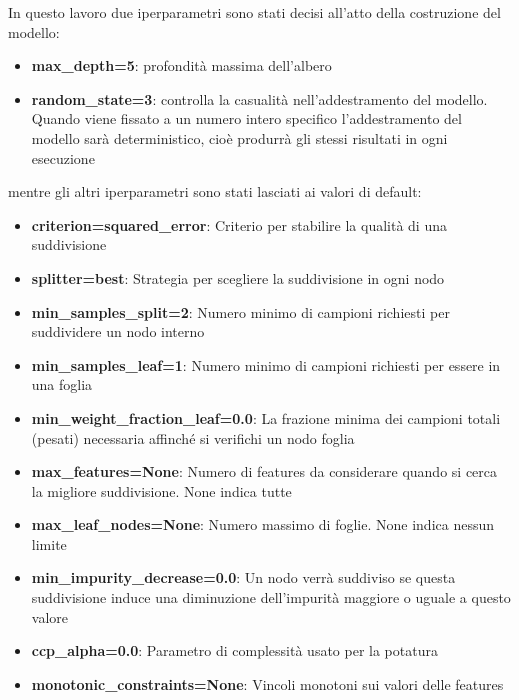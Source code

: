 \noindent In questo lavoro due iperparametri sono stati decisi all'atto della costruzione del modello:
\begin{itemize}
    \item \textbf{max\_depth=5}: profondità massima dell'albero
    \item \textbf{random\_state=3}:  controlla la casualità nell'addestramento del modello. Quando viene fissato a un numero intero specifico l'addestramento del modello sarà deterministico, cioè produrrà gli stessi risultati in ogni esecuzione
\end{itemize}
\noindent mentre gli altri iperparametri sono stati lasciati ai valori di default:
\begin{itemize}
    \item \textbf{criterion=squared\_error}: Criterio per stabilire la qualità di una suddivisione
    \item \textbf{splitter=best}: Strategia per scegliere la suddivisione in ogni nodo
    \item \textbf{min\_samples\_split=2}: Numero minimo di campioni richiesti per suddividere un nodo interno
    \item \textbf{min\_samples\_leaf=1}: Numero minimo di campioni richiesti per essere in una foglia
    \item \textbf{min\_weight\_fraction\_leaf=0.0}: La frazione minima dei campioni totali (pesati) necessaria affinché si verifichi un nodo foglia
    \item \textbf{max\_features=None}: Numero di features da considerare quando si cerca la migliore suddivisione. None indica tutte
    \item \textbf{max\_leaf\_nodes=None}: Numero massimo di foglie. None indica nessun limite
    \item \textbf{min\_impurity\_decrease=0.0}: Un nodo verrà suddiviso se questa suddivisione induce una diminuzione dell'impurità maggiore o uguale a questo valore
    \item \textbf{ccp\_alpha=0.0}: Parametro di complessità usato per la potatura
    \item \textbf{monotonic\_constraints=None}: Vincoli monotoni sui valori delle features
\end{itemize}

